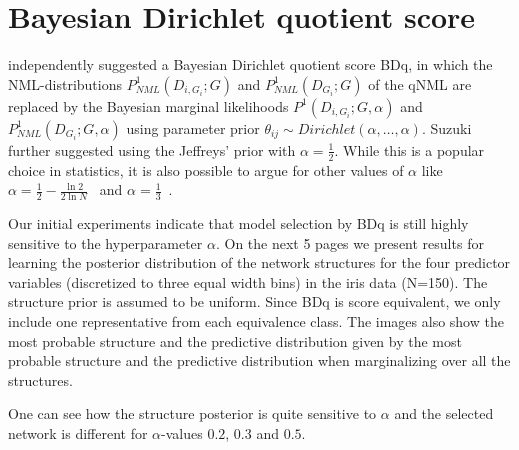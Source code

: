 \section{Bayesian Dirichlet quotient score}

\cite{Suzuki2017} independently suggested a Bayesian Dirichlet
quotient score BDq, in which the NML-distributions
$P^1_{NML}(D_{i,G_i};G)$ and $P^1_{NML}(D_{G_i};G)$ of the qNML are
replaced by the Bayesian marginal likelihoods
$P^1(D_{i,G_i};G,\alpha)$ and $P^1_{NML}(D_{G_i};G,\alpha)$ using
parameter prior $\theta_{ij} \sim
Dirichlet(\alpha,\ldots,\alpha)$. Suzuki further suggested using the
Jeffreys' prior with $\alpha=\frac{1}{2}$. While this is a
popular choice in statistics, it is also possible to argue for other
values of $\alpha$ like $\alpha=\frac{1}{2}-\frac{\ln 2}{2\ln
  N}$~\citep{watanabe15a} and $\alpha=\frac{1}{3}$~\citep{jaasaari18}.

Our initial experiments indicate that model selection by BDq is still
highly sensitive to the hyperparameter $\alpha$. On the next 5 pages we
present results for learning the posterior distribution of the network
structures for the four predictor variables (discretized to three
equal width bins) in the iris data (N=150). The structure prior is
assumed to be uniform. Since BDq is score equivalent, we only include
one representative from each equivalence class. The images also show
the most probable structure and the predictive distribution given by
the most probable structure and the predictive distribution when
marginalizing over all the structures.


One can see how the structure posterior is quite sensitive to $\alpha$
and the selected network is different for $\alpha$-values $0.2$, $0.3$
and $0.5$.




